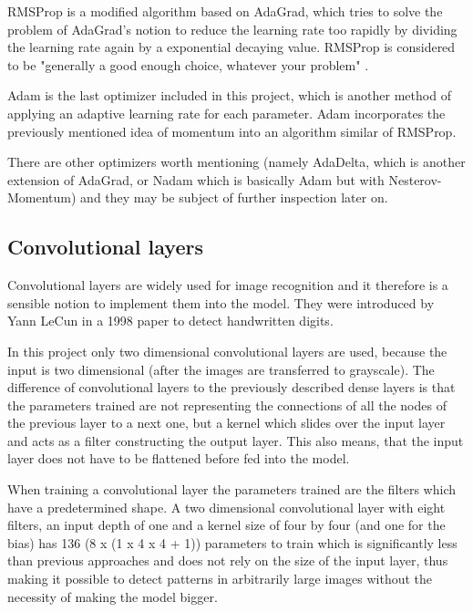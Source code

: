 RMSProp \cite{Hinton2012} is a modified algorithm based on AdaGrad, which tries to solve the problem of AdaGrad's notion to reduce the learning rate too rapidly by dividing the learning rate again by a exponential decaying value.
RMSProp is considered to be "generally a good enough choice, whatever your problem" \cite[p.77]{Chollet2017}.

Adam \cite{Kingma2014}\cite{Reddi2018} is the last optimizer included in this project, which is another method of applying an adaptive learning rate for each parameter.
Adam incorporates the previously mentioned idea of momentum into an algorithm similar of RMSProp.

There are other optimizers worth mentioning (namely AdaDelta, which is another extension of AdaGrad, or Nadam which is basically Adam but with Nesterov-Momentum) and they may be subject of further inspection later on.

\subsection{Convolutional layers}

Convolutional layers are widely used for image recognition and it therefore is a sensible notion to implement them into the model.
They were introduced by Yann LeCun in a 1998 paper \cite{LeCun1998} to detect handwritten digits.

In this project only two dimensional convolutional layers are used, because the input is two dimensional (after the images are transferred to grayscale).
The difference of convolutional layers to the previously described dense layers is that the parameters trained are not representing the connections of all the nodes of the previous layer to a next one, but a kernel which slides over the input layer and acts as a filter constructing the output layer.
This also means, that the input layer does not have to be flattened before fed into the model.

When training a convolutional layer the parameters trained are the filters which have a predetermined shape.
A two dimensional convolutional layer with eight filters, an input depth of one  and a kernel size of four by four (and one for the bias) has 136 (8 x (1 x 4 x 4 + 1)) parameters to train which is significantly less than previous approaches and does not rely on the size of the input layer, thus making it possible to detect patterns in arbitrarily large images without the necessity of making the model bigger.

